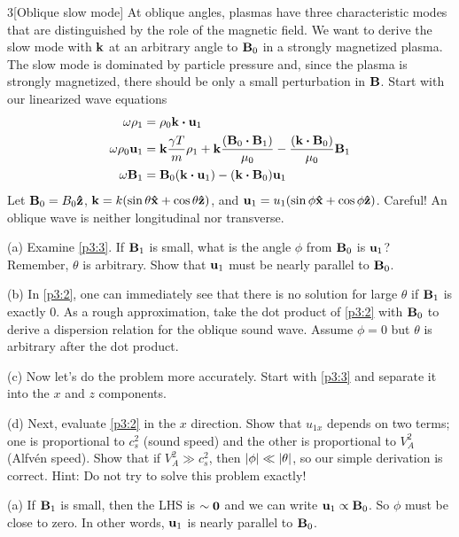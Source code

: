 \documentclass[12pt]{article}
\begin{document}
\begin{problem}{3}[Oblique slow mode]
At oblique angles, plasmas have three characteristic modes that are
distinguished by the role of the magnetic field. We want to derive the slow mode
with $\vb{k}$ at an arbitrary angle to $\vb{B}_0$ in a strongly magnetized
plasma. The slow mode is dominated by particle pressure and, since the plasma is
strongly magnetized, there should be only a small perturbation in $\vb{B}$.
Start with our linearized wave equations
\begin{subequations}
    \begin{align}
        \omega\rho_1&=\rho_0\vb{k}\vdot\vb{u}_1\label{p3:1}\\
        \omega\rho_0\vb{u}_1&=\vb{k}\frac{\gamma T}{m}\rho_1
        +\vb{k}\frac{\qty(\vb{B}_0\vdot\vb{B}_1)}{\mu_0}
        -\frac{\qty(\vb{k}\vdot\vb{B}_0)}{\mu_0}\vb{B}_1\label{p3:2}\\
        \omega\vb{B}_1&=\vb{B}_0\qty(\vb{k}\vdot\vb{u}_1)-\qty(\vb{k}\vdot\vb{B}_0)\vb{u}_1\label{p3:3}
    \end{align} 
\end{subequations}
Let $\vb{B}_0=B_0\vb{\hat{z}}$, $\vb{k}=k(\sin\theta\vb{\hat{x}}+\cos\theta\vb{\hat{z}})$, and
$\vb{u}_1=u_1\qty(\sin\phi\vb{\hat{x}}+\cos\phi\vb{\hat{z}})$. Careful! An oblique wave is
neither longitudinal nor transverse.

(a) Examine \eqref{p3:3}. If $\vb{B}_1$ is small, what is the angle $\phi$ from
$\vb{B}_0$ is $\vb{u}_1$? Remember, $\theta$ is arbitrary. Show that $\vb{u}_1$
must be nearly parallel to $\vb{B}_0$.

(b) In \eqref{p3:2}, one can immediately see that there is no solution for large
$\theta$ if $\vb{B}_1$ is exactly 0. As a rough approximation, take the dot
product of \eqref{p3:2} with $\vb{B}_0$ to derive a dispersion relation for
the oblique sound wave. Assume $\phi=0$ but $\theta$ is arbitrary after the dot
product.

(c) Now let's do the problem more accurately. Start with \eqref{p3:3} and
separate it into the $x$ and $z$ components.

(d) Next, evaluate \eqref{p3:2} in the $x$ direction. Show that $u_{1x}$ depends
on two terms; one is proportional to $c_s^2$ (sound speed) and the other is
proportional to $V_A^2$ (Alfvén speed). Show that if $V_A^2\gg c_s^2$, then
$\abs{\phi}\ll\abs{\theta}$, so our simple derivation is correct. Hint: Do not 
try to solve this problem exactly!
\begin{solution}
(a) If $\vb{B}_1$ is small, then the LHS is $\sim\vb{0}$ and we can write
$\vb{u}_1\propto\vb{B}_0$. So $\phi$ must be close to zero. In other words,
$\vb{u}_1$ is nearly parallel to $\vb{B}_0$.


\end{solution}
\end{problem}
\end{document}
